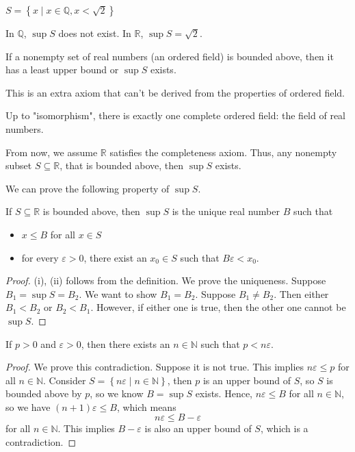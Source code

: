\begin{eg}
  \(S = \left\{ x \mid x \in \mathbb{Q} , x < \sqrt{2}  \right\} \) 
\end{eg}

In \(\mathbb{Q} \), \(\sup S\) does not exist. In \(\mathbb{R} \), \(\sup S = \sqrt{2} \).    

\begin{theorem}
  If a nonempty set of real numbers (an ordered field) is bounded above, then it has a least upper bound or \(\sup S\) exists. 
\end{theorem}
\begin{remark}
  This is an extra axiom that can't be derived from the properties of ordered field. 
\end{remark}
\begin{remark}
  Up to "isomorphism", there is exactly one complete ordered field: the field of real numbers.
\end{remark}
\begin{remark}
  From now, we assume \(\mathbb{R} \) satisfies the completeness axiom. Thus, any nonempty subset \(S \subseteq \mathbb{R} \), that is bounded above, then \(\sup S\) exists.   
\end{remark}
We can prove the following property of \(\sup S\).
\begin{theorem}
  If \(S \subseteq \mathbb{R} \) is bounded above, then \(\sup S\) is the unique real number \(B\) such that 
  \begin{itemize}
    \item [(i)] \(x \le B\) for all \(x \in S\)
    \item [(ii)] for every \(\varepsilon > 0\), there exist an \(x_0 \in S\) such that \(B \varepsilon < x_0\).     
  \end{itemize}   
\end{theorem} 
\begin{proof}
  (i), (ii) follows from the definition. We prove the uniqueness. Suppose \(B_1 = \sup S = B_2\). We want to show \(B_1 = B_2\). Suppose \(B_1 \neq B_2\). Then either \(B_1 < B_2\) or \(B_2 < B_1\). However, if either one is true, then the other one cannot be \(\sup S\).      
\end{proof}
\begin{theorem}\label{thm: Archimedean property}
  If \(p > 0\) and \(\varepsilon > 0\), then there exists an \(n \in \mathbb{N} \) such that \(p < n \varepsilon \).    
\end{theorem}
\begin{proof}
  We prove this contradiction. Suppose it is not true. This implies \(n \varepsilon \le p\) for all \(n \in \mathbb{N} \). Consider \(S = \left\{ n \varepsilon \mid n \in \mathbb{N}  \right\} \), then \(p\) is an upper bound of \(S\), so \(S\) is bounded above by \(p\), so we know \(B = \sup S\) exists. Hence, \(n \varepsilon \le B\) for all \(n \in \mathbb{N} \), so we have \((n+1)\varepsilon \le B\), which means
  \[
    n \varepsilon \le B - \varepsilon 
  \]   for all \(n \in \mathbb{N} \). This implies \(B - \varepsilon \) is also an upper bound of \(S\), which is a contradiction.   
\end{proof}

